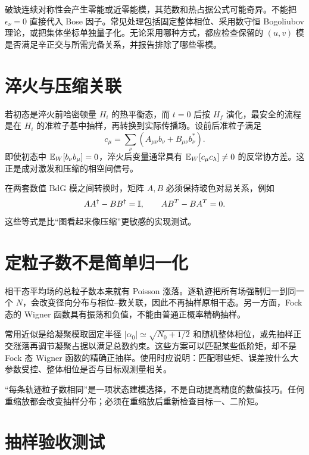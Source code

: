 破缺连续对称性会产生零能或近零能模，其范数和热占据公式可能奇异。不能把 $\epsilon_\nu=0$ 直接代入 Bose 因子。常见处理包括固定整体相位、采用数守恒 Bogoliubov 理论，或把集体坐标单独量子化。无论采用哪种方式，都应检查保留的 $(u,v)$ 模是否满足辛正交与所需完备关系，并报告排除了哪些零模。

\section{淬火与压缩关联}

若初态是淬火前哈密顿量 $H_i$ 的热平衡态，而 $t=0$ 后按 $H_f$ 演化，最安全的流程是在 $H_i$ 的准粒子基中抽样，再转换到实际传播场。设前后准粒子满足
\begin{equation}
  c_\mu=\sum_\nu\left(A_{\mu\nu}b_\nu+B_{\mu\nu}b_\nu^*\right).
  \label{eq:quench-bogoliubov-map}
\end{equation}
即使初态中 $\mathbb{E}_{W}\!\left[b_\nu b_\mu\right]=0$，淬火后变量通常具有
$\mathbb{E}_{W}\!\left[c_\mu c_\lambda\right]\neq0$ 的反常协方差。这正是成对激发和压缩的相空间信号。

在两套数值 BdG 模之间转换时，矩阵 $A,B$ 必须保持玻色对易关系，例如
\begin{equation}
  AA^\dagger-BB^\dagger=\mathbb{I},
  \qquad
  AB^T-BA^T=0.
  \label{eq:bogoliubov-map-constraints}
\end{equation}
这些等式是比“图看起来像压缩”更敏感的实现测试。

\section{定粒子数不是简单归一化}

相干态平均场的总粒子数本来就有 Poisson 涨落。逐轨迹把所有场强制归一到同一个 $N$，会改变径向分布与相位--数关联，因此不再抽样原相干态。另一方面，Fock 态的 Wigner 函数具有振荡和负值，不能由普通正概率精确抽样。

常用近似是给凝聚模取固定半径 $|\alpha_0|\simeq\sqrt{N_0+1/2}$ 和随机整体相位，或先抽样正交涨落再调节凝聚占据以满足总数约束。这些方案可以匹配某些低阶矩，却不是 Fock 态 Wigner 函数的精确正抽样。使用时应说明：匹配哪些矩、误差按什么大参数受控、整体相位是否与目标观测量相关。

\begin{warningbox}
“每条轨迹粒子数相同”是一项状态建模选择，不是自动提高精度的数值技巧。任何重缩放都会改变抽样分布；必须在重缩放后重新检查目标一、二阶矩。
\end{warningbox}

\section{抽样验收测试}

